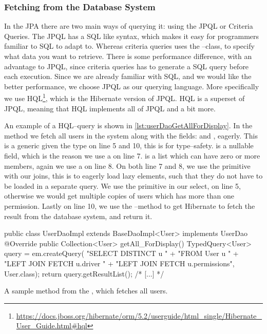 \subsubsection*{Fetching from the Database System}
In the \ac{JPA} there are two main ways of querying it: using the \ac{JPQL} or Criteria Queries.
The \ac{JPQL} has a \ac{SQL} like syntax, which makes it easy for programmers familiar to \ac{SQL} to adapt to.
Whereas criteria queries uses the --class, to specify what data you want to retrieve.
There is some performance difference, with an advantage to \ac{JPQL}, since criteria queries has to generate a \ac{SQL} query before each execution\cite{jboss_fetchingstrategies}.
Since we are already familiar with \ac{SQL}, and we would like the better performance, we choose \ac{JPQL} as our querying language.
More specifically we use \ac{HQL}\footnote{\url{https://docs.jboss.org/hibernate/orm/5.2/userguide/html_single/Hibernate_User_Guide.html\#hql}}, which is the Hibernate version of \ac{JPQL}.
\ac{HQL} is a superset of \ac{JPQL}, meaning that \ac{HQL} implements all of \ac{JPQL} and a bit more.

\bigskip
An example of a \ac{HQL}--query is shown in \cref{lst:userDaoGetAllForDisplay}.
In the method  we fetch all users in the system along with the fields:  and , eagerly.
This is a  generic given the type  on line 5 and 10, this is for type--safety.
 is a nullable field, which is the reason we use a  on line 7.
 is a list which can have zero or more members, again we use a  on line 8.
On both line 7 and 8, we use the  primitive with our joins,
this is to eagerly load lazy elements, such that they do not have to be loaded in a separate query.
We use the  primitive in our select, on line 5,
otherwise we would get multiple copies of users which has more than one permission.
Lastly on line 10, we use the --method to get Hibernate to fetch the result from the database system, and return it.
\begin{listing}
    \begin{java2}
public class UserDaoImpl extends BaseDaoImpl<User> implements UserDao {
    @Override
    public Collection<User> getAll_ForDisplay() {
        TypedQuery<User> query = em.createQuery(
            "SELECT DISTINCT u " +
                "FROM User u " +
                "LEFT JOIN FETCH u.driver " +
                "LEFT JOIN FETCH u.permissions",
            User.class);
        return query.getResultList();
    }
    /* [...] */
}
    \end{java2}
    \caption{A sample method from the , which fetches all users.}\label{lst:userDaoGetAllForDisplay}
\end{listing}

